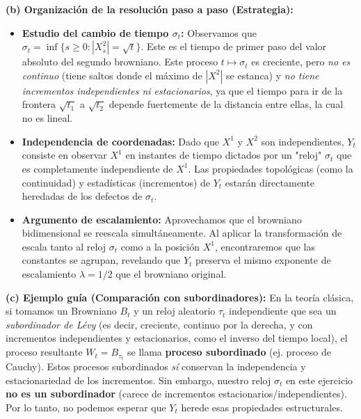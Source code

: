 \documentclass[11pt, letterpaper]{article}
\begin{document}
\vspace{5mm}

\begin{solucion}
    \textbf{(b) Organización de la resolución paso a paso (Estrategia):}
    \begin{itemize}
        \item[(i)] \textbf{Estudio del cambio de tiempo $\sigma_t$:} Observamos que $\sigma_t = \inf\{s \ge 0 : |X_s^2| = \sqrt{t}\}$. Este es el tiempo de primer paso del valor absoluto del segundo browniano. Este proceso $t \mapsto \sigma_t$ es creciente, pero \textit{no es continuo} (tiene saltos donde el máximo de $|X^2|$ se estanca) y \textit{no tiene incrementos independientes ni estacionarios}, ya que el tiempo para ir de la frontera $\sqrt{t_1}$ a $\sqrt{t_2}$ depende fuertemente de la distancia entre ellas, la cual no es lineal.
        \item[(ii)] \textbf{Independencia de coordenadas:} Dado que $X^1$ y $X^2$ son independientes, $Y_t$ consiste en observar $X^1$ en instantes de tiempo dictados por un "reloj" $\sigma_t$ que es completamente independiente de $X^1$. Las propiedades topológicas (como la continuidad) y estadísticas (incrementos) de $Y_t$ estarán directamente heredadas de los defectos de $\sigma_t$.
        \item[(iii)] \textbf{Argumento de escalamiento:} Aprovechamos que el browniano bidimensional se reescala simultáneamente. Al aplicar la transformación de escala tanto al reloj $\sigma_t$ como a la posición $X^1$, encontraremos que las constantes se agrupan, revelando que $Y_t$ preserva el mismo exponente de escalamiento $\lambda = 1/2$ que el browniano original.
    \end{itemize}

    \vspace{3mm}
    \textbf{(c) Ejemplo guía (Comparación con subordinadores):}
    En la teoría clásica, si tomamos un Browniano $B_t$ y un reloj aleatorio $\tau_t$ independiente que sea un \textit{subordinador de Lévy} (es decir, creciente, continuo por la derecha, y con incrementos independientes y estacionarios, como el inverso del tiempo local), el proceso resultante $W_t = B_{\tau_t}$ se llama \textbf{proceso subordinado} (ej. proceso de Cauchy). 
    Estos procesos subordinados \textit{sí} conservan la independencia y estacionariedad de los incrementos. Sin embargo, nuestro reloj $\sigma_t$ en este ejercicio \textbf{no es un subordinador} (carece de incrementos estacionarios/independientes). Por lo tanto, no podemos esperar que $Y_t$ herede esas propiedades estructurales.


\end{solucion}
\end{document}
